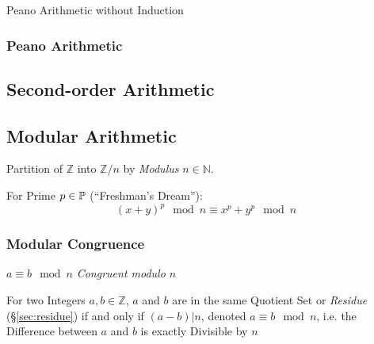 Peano Arithmetic without Induction



\subsubsection{Peano Arithmetic}\label{sec:peano_arithmetic}



\subsection{Second-order Arithmetic}\label{sec:second_order_arithmetic}

\subsection{Modular Arithmetic}\label{sec:modular_arithmetic}

Partition of $\mathbb{Z}$ into $\mathbb{Z}/n$ by \emph{Modulus} $n \in
\mathbb{N}$.

For Prime $p \in \mathbb{P}$ (``Freshman's Dream''):
\[
  (x+y)^p \mod n \equiv x^p + y^p \mod n
\]



\subsubsection{Modular Congruence}\label{sec:modular_congruence}

$a \equiv b \mod n$ \emph{Congruent modulo $n$}

For two Integers $a,b \in \mathbb{Z}$, $a$ and $b$ are in the same
Quotient Set or \emph{Residue} (\S\ref{sec:residue}) if and only if
$(a - b)|n$, denoted $a \equiv b \mod n$, i.e. the Difference between $a$ and
$b$ is exactly Divisible by $n$

